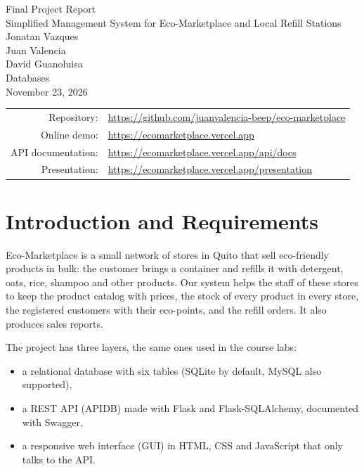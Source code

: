 \documentclass[11pt]{article}
\renewcommand{\_}{\oldus\allowbreak}
\newcommand{\repourl}{https://github.com/juanvalencia-beep/eco-marketplace}
\newcommand{\demourl}{https://ecomarketplace.vercel.app}
\begin{document}
\begin{titlepage}
\begin{center}
  \vspace*{3cm}
  {\LARGE Final Project Report}\\[0.8em]
  {\large Simplified Management System for Eco-Marketplace and Local Refill Stations}\\[3em]
  Jonatan Vazques\\[0.5em]
  Juan Valencia\\[0.5em]
  David Guanoluisa\\[2.5em]
  Databases\\[0.5em]
  November 23, 2026\\[4em]
  \begin{tabular}{rl}
    Repository: & \url{\repourl} \\
    Online demo: & \url{\demourl} \\
    API documentation: & \url{\demourl/api/docs} \\
    Presentation: & \url{\demourl/presentation} \\
  \end{tabular}
\end{center}
\end{titlepage}

\setcounter{tocdepth}{1}
\tableofcontents
\newpage

\section{Introduction and Requirements}

Eco-Marketplace is a small network of stores in Quito that sell eco-friendly products in bulk:
the customer brings a container and refills it with detergent, oats, rice, shampoo and other
products. Our system helps the staff of these stores to keep the product catalog with prices, the
stock of every product in every store, the registered customers with their eco-points, and the
refill orders. It also produces sales reports.

The project has three layers, the same ones used in the course labs:

\begin{itemize}[itemsep=0.1em]
  \item a relational database with six tables (SQLite by default, MySQL also supported),
  \item a REST API (APIDB) made with Flask and Flask-SQLAlchemy, documented with Swagger,
  \item a responsive web interface (GUI) in HTML, CSS and JavaScript that only talks to the API.
\end{itemize}
\end{document}
